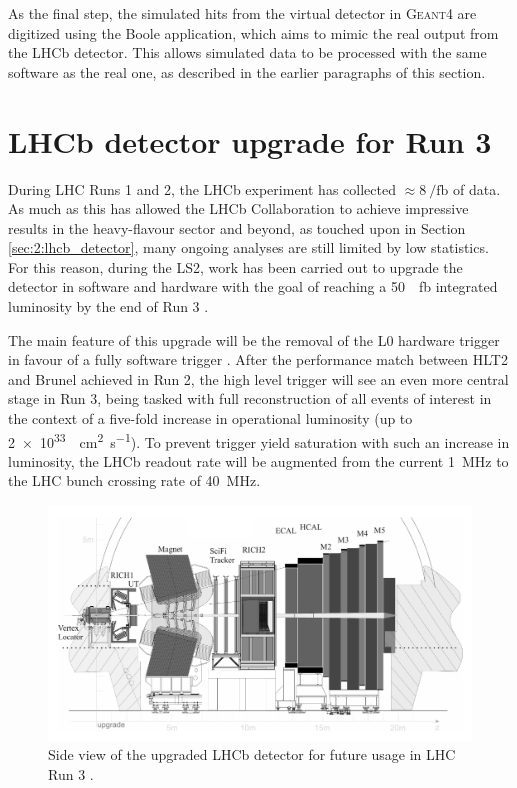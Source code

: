 As the final step, the simulated hits from the virtual detector in \textsc{Geant4} are digitized using the Boole application, which aims to mimic the real output from the LHCb detector.
This allows simulated data to be processed with the same software as the real one, as described in the earlier paragraphs of this section.

\section{LHCb detector upgrade for Run 3}
\label{sec:2:upgrade}

During LHC Runs 1 and 2, the LHCb experiment has collected $\approx \SI{8}{\per\femto\barn}$ of data.
As much as this has allowed the LHCb Collaboration to achieve impressive results in the heavy-flavour sector and beyond, as touched upon in Section \ref{sec:2:lhcb_detector}, many ongoing analyses are still limited by low statistics.
For this reason, during the LS2, work has been carried out to upgrade the detector in software and hardware with the goal of reaching a \SI{50}{\per\femto\barn} integrated luminosity by the end of Run 3 \cite{Piucci_2017}.

The main feature of this upgrade will be the removal of the L0 hardware trigger in favour of a fully software trigger \cite{CERN-LHCC-2014-016}.
After the performance match between HLT2 and Brunel achieved in Run 2, the high level trigger will see an even more central stage in Run 3, being tasked with full reconstruction of all events of interest in the context of a five-fold increase in operational luminosity (up to \SI{2e33}{\per\centi\meter\squared\per\second}).
To prevent trigger yield saturation with such an increase in luminosity, the LHCb readout rate will be augmented from the current \SI{1}{\mega\hertz} to the LHC bunch crossing rate of \SI{40}{\mega\hertz}.

\begin{figure}[t]
	\centering
	\includegraphics[width=\textwidth]{graphics/02-lhcb/lhcb_diagram_run3.png}
	\caption[LHCb detector side view (Run 3).]{Side view of the upgraded LHCb detector for future usage in LHC Run 3 \cite{Piucci_2017}.}
	\label{fig:2:lhcb_diagram_run3}
\end{figure}

